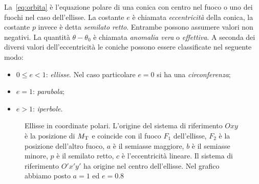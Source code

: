 La~\eqref{eq:orbita} è l'equazione polare di una conica con centro nel fuoco o
uno dei fuochi nel caso dell'ellisse. La costante $e$ è chiamata
\emph{eccentricità} della conica, la costante $p$ invece è detta
\emph{semilato retto}. Entrambe possono assumere valori non negativi. La
quantità $\theta - \theta_0$ è chiamata \emph{anomalia vera} o
\emph{effettiva}. A seconda dei diversi valori dell'eccentricità le coniche
possono essere classificate nel seguente modo:
\begin{itemize}
\item $0\leq e<1$: \emph{ellisse}. Nel caso particolare $e=0$ si ha una
  \emph{circonferenza};
\item $e=1$: \emph{parabola};
\item $e>1$: \emph{iperbole}.
\end{itemize}
\begin{figure}
  \centering
  \caption[Ellisse in coordinate polari]{Ellisse in coordinate polari. L'origine
    del sistema di riferimento $Oxy$ è la posizione di $M_\textup{T}$ e coincide
    con il fuoco $F_1$ dell'ellisse, $F_2$ è la posizione dell'altro fuoco, $a$
    è il semiasse maggiore, $b$ è il semiasse minore, $p$ è il semilato retto,
    $c$ è l'eccentricità lineare. Il sistema di riferimento $O'x'y'$ ha origine
    nel centro dell'ellisse. Nel grafico abbiamo posto $a=1$ ed $e=0.8$}
  \label{fig:ellisse}
\end{figure}

